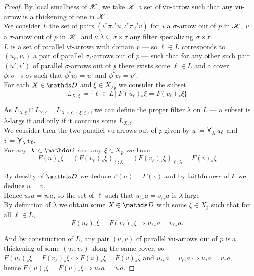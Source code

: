 \begin{proof}

    By local smallness of $\mathscr{X}$, we take $\mathscr{K}$ a set of vu-arrow such that any vu-arrow is a thickening of one in $\mathscr{K}$.\\

    We consider $L$ the set of pairs $(\iota^*{\pi_1}^* u, \iota^*{\pi_2}^* v)$ for $u$ a $\sigma$-arrow out of $p$ in $\mathscr{K}$, $v$ a $\tau$-arrow out of $p$ in $\mathscr{K}$, and $\iota : \lambda\subseteq\sigma\times\tau$ any filter specializing $\sigma\times\tau$.\\
    
    $L$ is a set of parallel vf-arrows with domain $p$ --- so $\ell\in L$ corresponds to $(u_\ell,v_\ell)$ a pair of parallel $\sigma_\ell$-arrows out of $p$ --- such that for any other such pair $(u',v')$ of parallel $\sigma$-arrows out of $p$ there exists some $\ell\in L$ and a cover $\phi : \sigma\twoheadrightarrow\sigma_\ell$ such that $\phi^*u_\ell = u'$ and $\phi^*v_\ell = v'$.\\
    
    For each $X\in\dsD$ and $\xi\in X_{Fp}$ we consider the subset \[L_{X,\xi}\coloneqq\{\ell\in L \ |\ F(u_\ell)_*\xi = F(v_\ell)_*\xi\}\]

    As $L_{X,\xi}\cap L_{Y,\zeta} = L_{X\times Y,(\xi,\zeta)}$, we can define the proper filter $\lambda$ on $L$ --- a subset is $\lambda$-large if and only if it contains some $L_{X,\xi}$.\\

    We consider then the two parallel vu-arrows out of $p$ given by $u \coloneqq \bigcurlyvee_{\lambda} u_\ell$ and $v = \bigcurlyvee_{\lambda}v_\ell$.\\
    
    For any $X\in\dsD$ and any $\xi\in X_p$ we have
    \[F(u)_*\xi = (F(u_\ell)_*\xi)_{\ell:\lambda} = (F(v_\ell)_*\xi)_{\ell:\lambda} = F(v)_*\xi\]
    
    By density of $\dsD$ we deduce $F(u) = F(v)$ and by faithfulness of $F$ we deduce $u = v$.\\
    
    Hence $u_*a = v_*a$, so the set of $\ell$ such that ${u_\ell}_*a = {v_\ell}_*a$ is $\lambda$-large\\
    
    By definition of $\lambda$ we obtain some $X\in\dsD$ with some $\xi\in X_p$ such that for all $\ell\in L$,
    \[F(u_\ell)_*\xi = F(v_\ell)_*\xi \Rightarrow {u_\ell}_*a = {v_\ell}_*a.\]

    And by construction of $L$, any pair $(u,v)$ of parallel vu-arrows out of $p$ is a thickening of some $(u_\ell,v_\ell)$ along the same cover, so $F(u_\ell)_*\xi = F(v_\ell)_*\xi\Leftrightarrow F(u)_*\xi = F(v)_*\xi$ and ${u_\ell}_*a = {v_\ell}_*a \Leftrightarrow {u}_*a = {v}_*a$, hence $F(u)_*\xi = F(v)_*\xi \Rightarrow {u}_*a = {v}_*a$.
\end{proof}

